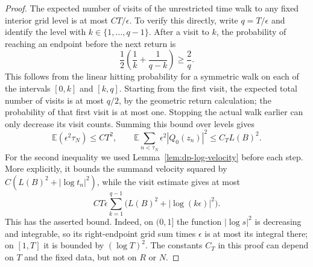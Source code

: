 \begin{proof}
The expected number of visits of the unrestricted time walk to any fixed
interior grid level is at most $CT/\epsilon$. To verify this directly,
write $q=T/\epsilon$ and identify the level with $k\in\{1,\ldots,q-1\}$.
After a visit to $k$, the
probability of reaching an endpoint before the next return is
\[
  \frac12\left(\frac1k+\frac1{q-k}\right)\ge\frac2q.
\]
This follows from the linear hitting probability for a symmetric walk on
each of the intervals $[0,k]$ and $[k,q]$. Starting from the first visit,
the expected total number of visits is at most $q/2$, by the geometric
return calculation; the probability of that first visit is at most one.
Stopping the actual walk earlier can only decrease its visit counts.
Summing this bound over levels gives
\begin{equation}\label{eq:contact-time-and-velocity-budget}
  \mathbb E(\epsilon^2\tau_N)\le CT^2,\qquad
  \mathbb E\sum_{n<\tau_N}\epsilon^2|Q_0(z_n)|^2
       \le C_T L(B)^2.
\end{equation}
For the second inequality we used Lemma~\ref{lem:dp-log-velocity} before
each step.  More explicitly, it bounds the summand velocity squared by
$C(L(B)^2+|\log t_n|^2)$, while the visit estimate gives at most
\[
  CT\epsilon\sum_{k=1}^{q-1}
           \bigl(L(B)^2+|\log(k\epsilon)|^2\bigr).
\]
This has the asserted bound.  Indeed, on $(0,1]$ the function
$|\log s|^2$ is decreasing and integrable, so its right-endpoint grid sum
times $\epsilon$ is at most its integral there; on $[1,T]$ it is bounded by
$(\log T)^2$.  The constants $C_T$ in this proof can depend on $T$ and the
fixed data, but not on $R$ or $N$.


\end{proof}
